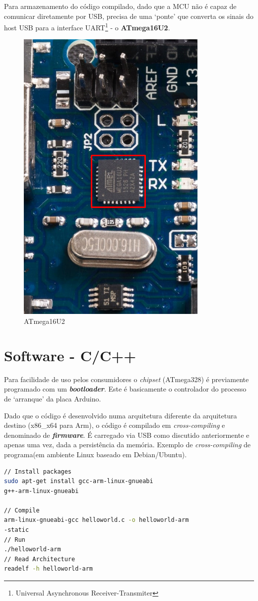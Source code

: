 Para armazenamento do código compilado, dado que a MCU não é capaz de comunicar diretamente por USB, precisa de uma `ponte' que converta os sinais do host USB para a interface UART\footnote{Universal Asynchronous Receiver-Transmiter} - o \textbf{ATmega16U2}.

\begin{figure}[H]
    \centering
    \includegraphics[scale=0.8, angle=-90]{images/atmega16u2.png}
    \caption{ATmega16U2}
\end{figure}

\section{Software - C/C++}

Para facilidade de uso pelos consumidores o \textit{chipset} (ATmega328) é previamente programado com um \textit{\textbf{bootloader}}. Este é basicamente o controlador do processo de `arranque' da placa Arduino.

Dado que o código é desenvolvido numa arquitetura diferente da arquitetura destino (x86\_x64 para Arm), o código é compilado em \textit{cross-compiling} e denominado de \textit{\textbf{firmware}}. É carregado via USB como discutido anteriormente e apenas uma vez, dada a persistência da memória. 
\newpage
Exemplo de \textit{cross-compiling} de programa(em ambiente Linux baseado em Debian/Ubuntu).

\begin{lstlisting}[language=bash]
// Install packages
sudo apt-get install gcc-arm-linux-gnueabi 
g++-arm-linux-gnueabi

// Compile
arm-linux-gnueabi-gcc helloworld.c -o helloworld-arm 
-static
// Run
./helloworld-arm
// Read Architecture
readelf -h helloworld-arm
\end{lstlisting}